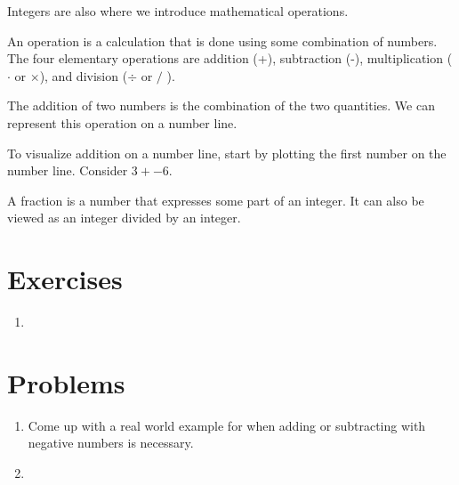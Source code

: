  Integers are also where we introduce mathematical operations. 



\begin{defn}[Operation]
An operation is a calculation that is done using some combination of numbers. The four elementary operations are addition (+), subtraction (-), multiplication ( $\cdot$ or $\times$), and division ($\div$ or $/$  ).
\end{defn}
The addition of two numbers is the combination of the two quantities. We can represent this operation on a number line.
\begin{example}
	To visualize addition on a number line, start by plotting the first number on the number line. Consider $3+-6$.
	
	\begin{center}
	\end{center}


	\begin{center}
	\end{center}

\end{example}




\begin{defn}[Fraction]
	A fraction is a number that expresses some part of an integer. It can also be viewed as an integer divided by an integer. 
\end{defn}

\section{Exercises}

\begin{enumerate}
\item 	
\end{enumerate}


\section{Problems}


\begin{enumerate}

\item Come up with a real world example for when adding or subtracting with negative numbers is necessary. 
\item 
\end{enumerate}


